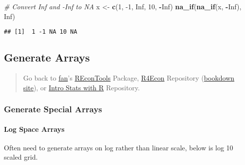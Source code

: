\documentclass[
]{book}
\newenvironment{Shaded}{\begin{snugshade}}{\end{snugshade}}
\newcommand{\CommentTok}[1]{\textcolor[rgb]{0.56,0.35,0.01}{\textit{#1}}}
\newcommand{\DecValTok}[1]{\textcolor[rgb]{0.00,0.00,0.81}{#1}}
\newcommand{\KeywordTok}[1]{\textcolor[rgb]{0.13,0.29,0.53}{\textbf{#1}}}
\newcommand{\NormalTok}[1]{#1}
\newcommand{\OperatorTok}[1]{\textcolor[rgb]{0.81,0.36,0.00}{\textbf{#1}}}
\newcommand{\OtherTok}[1]{\textcolor[rgb]{0.56,0.35,0.01}{#1}}
\newcommand{\StringTok}[1]{\textcolor[rgb]{0.31,0.60,0.02}{#1}}
\begin{document}
\begin{Shaded}
\begin{Highlighting}[]
\CommentTok{# Convert Inf and -Inf to NA}
\NormalTok{x <-}\StringTok{ }\KeywordTok{c}\NormalTok{(}\DecValTok{1}\NormalTok{, }\DecValTok{-1}\NormalTok{, }\OtherTok{Inf}\NormalTok{, }\DecValTok{10}\NormalTok{, }\OperatorTok{-}\OtherTok{Inf}\NormalTok{)}
\KeywordTok{na_if}\NormalTok{(}\KeywordTok{na_if}\NormalTok{(x, }\OperatorTok{-}\OtherTok{Inf}\NormalTok{), }\OtherTok{Inf}\NormalTok{)}
\end{Highlighting}
\end{Shaded}

\begin{verbatim}
## [1]  1 -1 NA 10 NA
\end{verbatim}

\hypertarget{generate-arrays}{%
\subsection{Generate Arrays}\label{generate-arrays}}

\begin{quote}
Go back to \href{http://fanwangecon.github.io/CodeDynaAsset/}{fan}'s \href{https://fanwangecon.github.io/REconTools/}{REconTools} Package, \href{https://fanwangecon.github.io/R4Econ/}{R4Econ} Repository (\href{https://fanwangecon.github.io/R4Econ/bookdown}{bookdown site}), or \href{https://fanwangecon.github.io/Stat4Econ/}{Intro Stats with R} Repository.
\end{quote}

\hypertarget{generate-special-arrays}{%
\subsubsection{Generate Special Arrays}\label{generate-special-arrays}}

\hypertarget{log-space-arrays}{%
\paragraph{Log Space Arrays}\label{log-space-arrays}}

Often need to generate arrays on log rather than linear scale, below is log 10 scaled grid.
\end{document}
